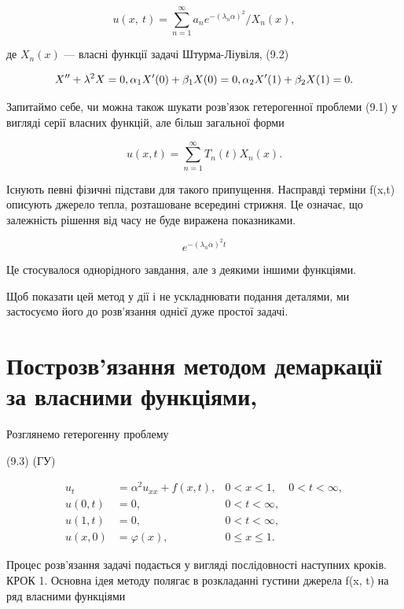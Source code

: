 \documentclass[
  ukrainian,
]{article}
\begin{document}
\[
u\left(x,\ t\right)=\sum_{n=1}^{\infty}a_{n}e^{-\left(\lambda_{n}\alpha\right)^{2}}/X_{n}\left(x\right),
\]

де \(X_n(x)\) --- власні функції задачі Штурма-Ліувіля, (9.2)

\[
X'' + \lambda^2 X = 0, \\ \alpha_1 X'(0) + \beta_1 X(0) = 0, \\ \alpha_2 X'(1) + \beta_2 X(1) = 0.
\]

Запитаймо себе, чи можна також шукати розв'язок гетерогенної проблеми
(9.1) у вигляді серії власних функцій, але більш загальної форми

\[
u(x, t) = \sum_{n=1}^{\infty} T_n(t) X_n(x).
\]

Існують певні фізичні підстави для такого припущення. Насправді терміни
f(x,t) описують джерело тепла, розташоване всередині стрижня. Це
означає, що залежність рішення від часу не буде виражена показниками.

\[
e^{-(\lambda_n\alpha)^2 t}
\]

Це стосувалося однорідного завдання, але з деякими іншими функціями.

Щоб показати цей метод у дії і не ускладнювати подання деталями, ми
застосуємо його до розв'язання однієї дуже простої задачі.

\section{Построзв'язання методом демаркації за власними
функціями,}\label{ux43fux43eux441ux442ux440ux43eux437ux432ux44fux437ux430ux43dux43dux44f-ux43cux435ux442ux43eux434ux43eux43c-ux434ux435ux43cux430ux440ux43aux430ux446ux456ux457-ux437ux430-ux432ux43bux430ux441ux43dux438ux43cux438-ux444ux443ux43dux43aux446ux456ux44fux43cux438}

Розглянемо гетерогенну проблему

(9.3) (ГУ)

\[
\begin{aligned} u_t &= \alpha^2 u_{xx} + f(x, t), & 0 < x < 1, & 0 < t < \infty, \\ u(0, t) &= 0, & 0 < t < \infty, \\ u(1, t) &= 0, & 0 < t < \infty, \\ u(x, 0) &= \varphi(x), & 0 \leqslant x \leqslant 1. \end{aligned}
\]

Процес розв'язання задачі подається у вигляді послідовності наступних
кроків. КРОК 1. Основна ідея методу полягає в розкладанні густини
джерела f(x, t) на ряд власними функціями
\end{document}

